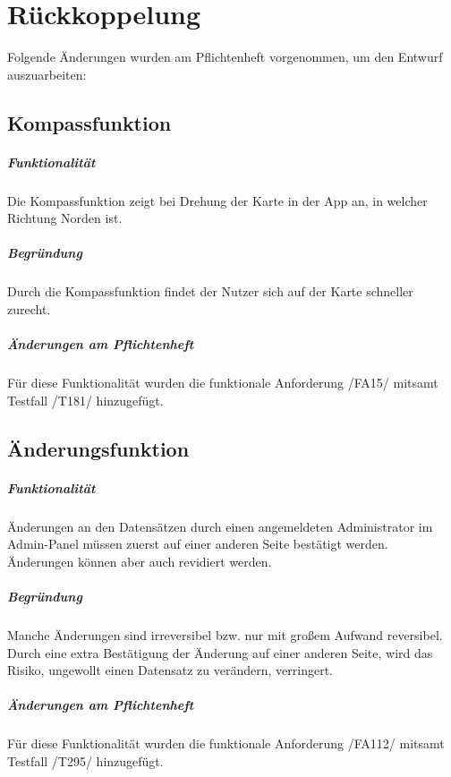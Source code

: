 \chapter*{Rückkoppelung}
Folgende Änderungen wurden am Pflichtenheft vorgenommen, um den Entwurf auszuarbeiten:

\section*{Kompassfunktion}
\paragraph*{Funktionalität}
Die Kompassfunktion zeigt bei Drehung der Karte in der App an, in welcher Richtung Norden ist.

\paragraph*{Begründung}
Durch die Kompassfunktion findet der Nutzer sich auf der Karte schneller zurecht.

\paragraph*{Änderungen am Pflichtenheft}
Für diese Funktionalität wurden die funktionale Anforderung /FA15/ mitsamt Testfall /T181/ hinzugefügt.

\section*{Änderungsfunktion}
\paragraph*{Funktionalität}
Änderungen an den Datensätzen durch einen angemeldeten Administrator im Admin-Panel müssen zuerst auf einer anderen Seite bestätigt werden.
Änderungen können aber auch revidiert werden.

\paragraph*{Begründung}
Manche Änderungen sind irreversibel bzw. nur mit großem Aufwand reversibel. Durch eine extra Bestätigung der Änderung auf einer anderen Seite,
wird das Risiko, ungewollt einen Datensatz zu verändern, verringert.

\paragraph*{Änderungen am Pflichtenheft}
Für diese Funktionalität wurden die funktionale Anforderung /FA112/ mitsamt Testfall /T295/ hinzugefügt.